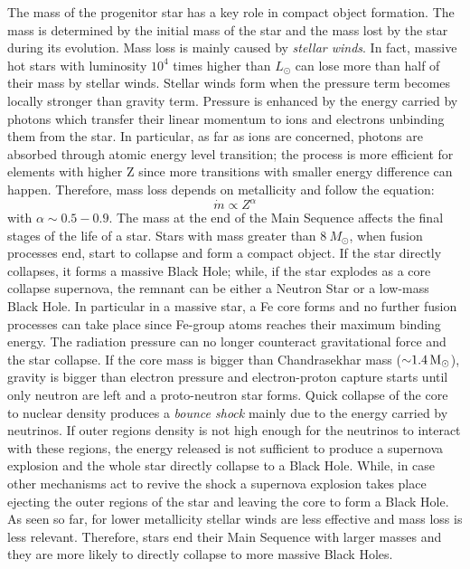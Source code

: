 \documentclass[prb,twocolumn,9pt]{revtex4-1}
\begin{document}
The mass of the progenitor star has a key role in compact object formation. The mass is determined by the initial mass of the star and the mass lost by the star during its evolution. Mass loss is mainly caused by \textit{stellar winds}. In fact, massive hot stars with luminosity \(10^4\) times higher than \(L_\odot\) can lose more than half of their mass by stellar winds. Stellar winds form when the pressure term becomes locally stronger than gravity term. Pressure is enhanced by the energy carried by photons which transfer their linear momentum to ions and electrons unbinding them from the star. In particular,  as far as ions are concerned, photons are absorbed through atomic energy level transition; the process is more efficient for elements with higher Z since more transitions with smaller energy difference can happen. Therefore, mass loss depends on metallicity and follow the equation: 
\begin{equation}
    \dot{m} \propto Z^{\alpha}
\end{equation}
with \( \alpha \sim 0.5 - 0.9\).
The mass at the end of the Main Sequence affects the final stages of the life of a star. Stars with mass greater than \(\SI{8}{M_\odot}\), when fusion processes end, start to collapse and form a compact object. If the star directly collapses, it forms a massive Black Hole; while, if the star explodes as a core collapse supernova, the remnant can be either a Neutron Star or a low-mass Black Hole. 
In particular in a massive star, a Fe core forms and no further fusion processes can take place since Fe-group atoms reaches their maximum binding energy. The radiation pressure can no longer counteract gravitational force and the star collapse. If the core mass is bigger than Chandrasekhar mass (\(\SI{\sim 1.4}{M_\odot}\)), gravity is bigger than electron pressure and electron-proton capture starts until only neutron are left and a proto-neutron star forms. Quick collapse of the core to nuclear density produces a \textit{bounce shock} mainly due to the energy carried by neutrinos. If outer regions density is not high enough for the neutrinos to interact with these regions, the energy released is not sufficient to produce a supernova explosion and the whole star directly collapse to a Black Hole. While, in case other mechanisms act to revive the shock a supernova explosion takes place ejecting the outer regions of the star and leaving the core to form a Black Hole. 
As seen so far, for lower metallicity stellar winds are less effective and mass loss is less relevant. Therefore, stars end their Main Sequence with larger masses and they are more likely to directly collapse to more massive Black Holes.
\end{document}
